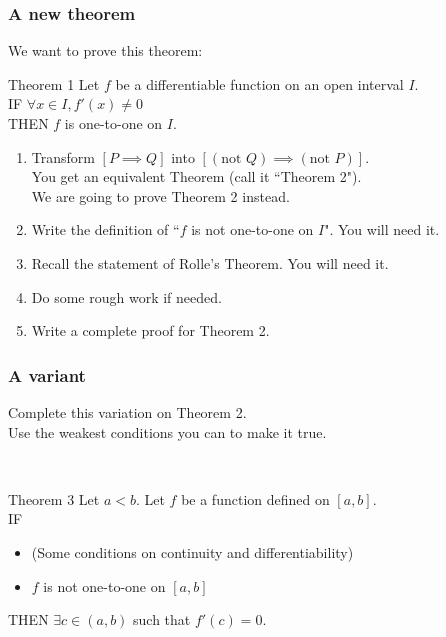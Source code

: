 \documentclass[14pt]{beamer}
\newcommand {\DS} [1] {${\displaystyle #1}$}
\newcommand{\setsize}[1]{\fontsize{#1}{#1}\selectfont} %
\newcommand{\smallerfont}{\setsize{13}} %
\begin{document}
\begin{frame}[t]
\smallerfont
\frametitle{A new theorem}

We want to prove this theorem:
\begin{block}{\smallerfont Theorem 1}
Let $f$ be a differentiable function on an open interval $I$. \\
IF
	\DS{\forall x \in I, f'(x) \neq 0} \\
THEN
	$f$ is one-to-one on $I$.
\end{block}

\vfill \pause

\begin{enumerate}
	\item Transform  \quad \DS{[P \implies Q]} \quad into \quad \DS{ [(\mbox{not } Q) \implies (\mbox{not } P)]}. \\
		You get an equivalent Theorem (call it ``Theorem 2").  \\
		We are going to prove Theorem 2 instead.
	\item  Write the definition of ``$f$ is not one-to-one on $I$".  You will need it.
	\item  Recall the statement of Rolle's Theorem.  You will need it.
	\item  Do some rough work if needed.
	\item  Write a complete proof for Theorem 2.
\end{enumerate}

\end{frame}

\begin{frame}[t]
\frametitle{A variant}

Complete this variation on Theorem 2. \\ 
Use the weakest conditions you can to make it true.  

\


\begin{block}{Theorem 3}
Let $a<b$.  Let $f$ be a function defined on $[a,b]$. \\
IF
	\begin{itemize}
		\item (Some conditions on continuity and differentiability)
		\item  $f$ is not one-to-one on $[a,b]$
	\end{itemize}
THEN 
		  \DS{\exists c \in (a,b)} such that $f'(c)=0$.
\end{block}


\end{frame}
\end{document}
